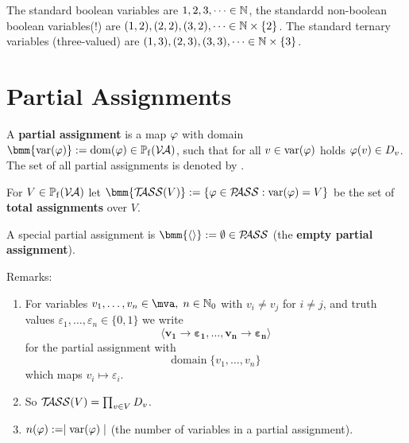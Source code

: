 \documentclass[12pt]{book}
\begin{document}
\begin{examp}\label{exp:var}
  The standard boolean variables are $1, 2, 3, \dots \in \mathbb{N}$, the standardd non-boolean boolean variables(!) are $(1,2), (2,2), (3,2), \dots \in \mathbb{N} \times \{ 2 \}$. The standard ternary variables (three-valued) are $(1,3), (2,3), (3,3), \dots \in \mathbb{N} \times \{ 3 \}$.
\end{examp}


\section{Partial Assignments}
\label{sec:Partialassignments}

\begin{defi}\label{def:Pass}
  A \textbf{partial assignment} is a map $\varphi$ with domain $\bmm{\var(\vp)} := \dom(\vp) \in \pote(\Va)$, such that for all $v \in \operatorname{var}(\varphi)$ holds $\varphi(v) \in D_v$. The set of all partial assignments is denoted by \bmm{\Pass}.

 For $V \in \operatorname{\mathbb{P}_f}(\mathcal{V\hspace{-0.1em}A})$ let $\bmm{\Tass(V)} := \set{\vp \in \Pass : \var(\vp) = V}$ be the set of \textbf{total assignments} over $V$.

  A special partial assignment is $\bmm{\epa} := \es \in \Pass$ (the \textbf{empty partial assignment}).
\end{defi}
Remarks:
\begin{enumerate}
\item For variables $v_1, \ldots, v_n \in \mva, \; n\in \mathbb{N}_0$ with $v_i \neq v_j$ for $i\neq j$, and truth values $\varepsilon_1, \ldots, \varepsilon_n \in \{0,1\}$ we write
\begin{displaymath}
\pmb{\langle v_1 \to \varepsilon_1, \ldots, v_n \to \varepsilon_n\rangle}
\end{displaymath}
for the partial assignment with
\begin{displaymath}
\mbox{domain} \; \{v_1, \ldots, v_n\}
\end{displaymath}
which maps $v_i \mapsto \varepsilon_i$.

\item So $\mathcal{T\hspace{-0.35em}ASS}(V) = \prod_{v \in V} D_v$.
\item $n(\varphi) := \mid \operatorname{var}(\varphi) \mid$ (the number of variables in a partial assignment).
\end{enumerate}

\end{document}
